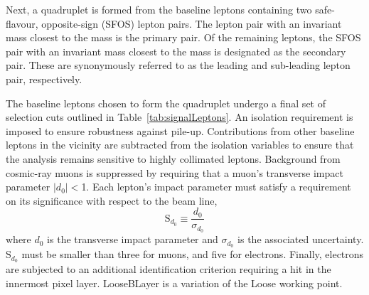 Next, a quadruplet is formed from the baseline leptons containing two safe-flavour, opposite-sign (SFOS) lepton pairs. The lepton pair with an invariant mass closest to the \Z mass is the primary pair. Of the remaining leptons, the SFOS pair with an invariant mass closest to the \Z mass is designated as the secondary pair. These are synonymously referred to as the leading and sub-leading lepton pair, respectively. 

The baseline leptons chosen to form the quadruplet undergo a final set of selection cuts outlined in Table~\ref{tab:signalLeptons}. An isolation requirement is imposed to ensure robustness against pile-up. Contributions from other baseline leptons in the vicinity are subtracted from the isolation variables to ensure that the analysis remains sensitive to highly collimated leptons. Background from cosmic-ray muons is suppressed by requiring that a muon's transverse impact parameter $|d_0|<$\unit{1}{\mm}. Each lepton's impact parameter must satisfy a requirement on its significance with respect to the beam line,
\begin{equation}
    \text{S}_{d_0}\equiv\dfrac{d_0}{\sigma_{d_0}}
\end{equation}
where $d_0$ is the transverse impact parameter and $\sigma_{d_0}$ is the associated uncertainty. $\text{S}_{d_0}$ must be smaller than three for muons, and five for electrons. Finally, electrons are subjected to an additional identification criterion requiring a hit in the innermost pixel layer. LooseBLayer is a variation of the Loose working point. 

